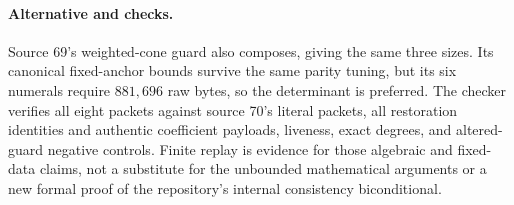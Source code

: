 \paragraph{Alternative and checks.}
Source 69's weighted-cone guard also composes, giving the same three sizes.
Its canonical fixed-anchor bounds survive the same parity tuning, but its
six numerals require $881{,}696$ raw bytes, so the determinant is preferred.
The checker verifies all eight packets against source 70's literal packets,
all restoration identities and authentic coefficient payloads, liveness,
exact degrees, and altered-guard negative controls.
Finite replay is evidence for those algebraic and fixed-data claims, not a
substitute for the unbounded mathematical arguments or a new formal proof
of the repository's internal consistency biconditional.

